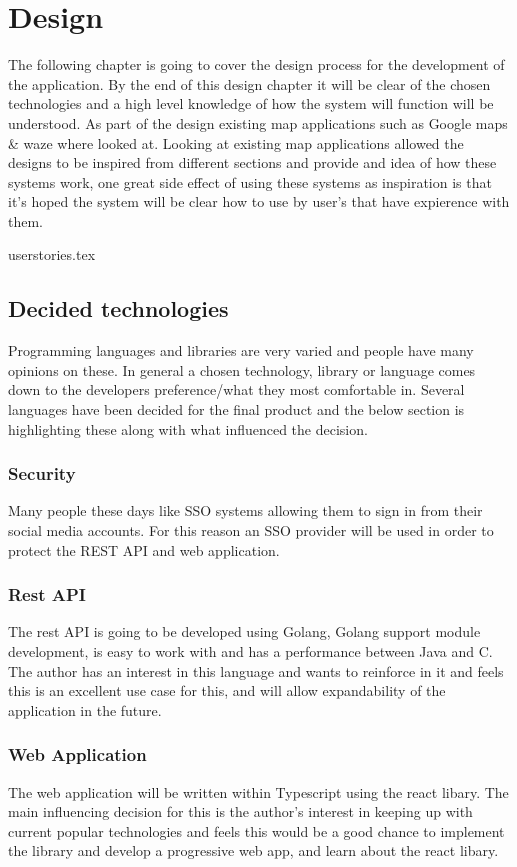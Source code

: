 \section{Design}
The following chapter is going to cover the design process for the development of the application. By the end of this design chapter it will be clear of the chosen technologies and a high level knowledge of how the system will function will be understood. As part of the design existing map applications such as Google maps \& waze where looked at. Looking at existing map applications allowed the designs to be inspired from different sections and provide and idea of how these systems work, one great side effect of using these systems as inspiration is that it's hoped the system will be clear how to use by user's that have expierence with them.

{userstories.tex}

\subsection{Decided technologies}
Programming languages and libraries are very varied and people have many opinions on these. In general a chosen technology, library or language comes down to the developers preference/what they most comfortable in. Several languages have been decided for the final product and the below section is highlighting these along with what influenced the decision.

\subsubsection{Security}
Many people these days like SSO systems allowing them to sign in from their social media accounts. For this reason an SSO provider will be used in order to protect the REST API and web application.

\subsubsection{Rest API}
The rest API is going to be developed using Golang, Golang support module development, is easy to work with and has a performance between Java and C. The author has an interest in this language and wants to reinforce in it and feels this is an excellent use case for this, and will allow expandability of the application in the future.

\subsubsection{Web Application}
The web application will be written within Typescript using the react libary. The main influencing decision for this is the author's interest in keeping up with current popular technologies and feels this would be a good chance to implement the library and develop a progressive web app, and learn about the react libary.

